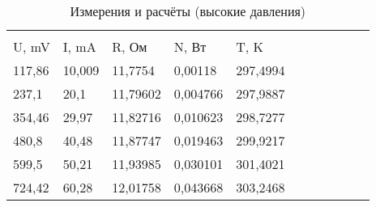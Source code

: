 \documentclass[12pt,a4paper]{article}
\begin{document}
\begin{enumerate}
{\begin{table}[p]
{\begin{tabular}{lllllllllll}
							&
							&
							&
							&
							&
							\\ \cline{1-5}
							\multicolumn{1}{|l|}{U, mV} &
							\multicolumn{1}{l|}{I, mA} &
							\multicolumn{1}{l|}{R, Ом} &
							\multicolumn{1}{l|}{N, Вт} &
							\multicolumn{1}{l|}{T, K} &
							&
							&
							&
							&
							&
							\\ \cline{1-5}
							\multicolumn{1}{|l|}{117,86} &
							\multicolumn{1}{l|}{10,009} &
							\multicolumn{1}{l|}{11,7754} &
							\multicolumn{1}{l|}{0,00118} &
							\multicolumn{1}{l|}{297,4994} &
							&
							&
							&
							&
							&
							\\ \cline{1-5}
							\multicolumn{1}{|l|}{237,1} &
							\multicolumn{1}{l|}{20,1} &
							\multicolumn{1}{l|}{11,79602} &
							\multicolumn{1}{l|}{0,004766} &
							\multicolumn{1}{l|}{297,9887} &
							&
							&
							&
							&
							&
							\\ \cline{1-5}
							\multicolumn{1}{|l|}{354,46} &
							\multicolumn{1}{l|}{29,97} &
							\multicolumn{1}{l|}{11,82716} &
							\multicolumn{1}{l|}{0,010623} &
							\multicolumn{1}{l|}{298,7277} &
							&
							&
							&
							&
							&
							\\ \cline{1-5}
							\multicolumn{1}{|l|}{480,8} &
							\multicolumn{1}{l|}{40,48} &
							\multicolumn{1}{l|}{11,87747} &
							\multicolumn{1}{l|}{0,019463} &
							\multicolumn{1}{l|}{299,9217} &
							&
							&
							&
							&
							&
							\\ \cline{1-5}
							\multicolumn{1}{|l|}{599,5} &
							\multicolumn{1}{l|}{50,21} &
							\multicolumn{1}{l|}{11,93985} &
							\multicolumn{1}{l|}{0,030101} &
							\multicolumn{1}{l|}{301,4021} &
							&
							&
							&
							&
							&
							\\ \cline{1-5}
							\multicolumn{1}{|l|}{724,42} &
							\multicolumn{1}{l|}{60,28} &
							\multicolumn{1}{l|}{12,01758} &
							\multicolumn{1}{l|}{0,043668} &
							\multicolumn{1}{l|}{303,2468} &
							&
							&
							&
							&
							&
							\\ \cline{1-5}
						\end{tabular}%
					}
					\caption{Измерения и расчёты (высокие давления)}
					\label{tab:my-table}
				\end{table}
		\clearpage
		}
		
		
\end{enumerate}
\end{document}
